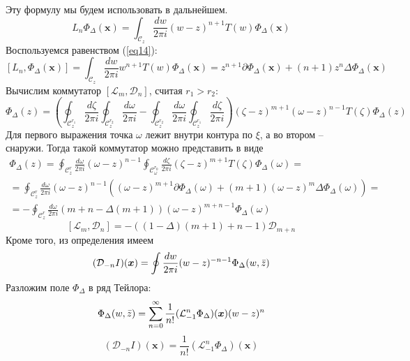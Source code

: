 \documentclass[12pt]{article}
\theoremstyle{definition}
\begin{document}
Эту формулу мы будем использовать в дальнейшем.
\begin{equation}
    L_n\Phi_\Delta(\bm{x})=\int_{\mathcal{C}_z}\frac{dw}{2\pi i}(w-z)^{n+1}T(w)\Phi_\Delta(\bm{x})
\end{equation}
Воспользуемся равенством (\ref{eq14}):
\begin{equation}\label{eq11}
    [L_n,\Phi_\Delta(\bm{x})]=\int_{\mathcal{C}_z}\frac{dw}{2\pi i}w^{n+1}T(w)\Phi_\Delta(\bm{x})=z^{n+1}\partial\Phi_\Delta(\bm{x})+(n+1)z^n\Delta\Phi_\Delta(\bm{x})
\end{equation}
Вычислим коммутатор $[\mathcal{L}_m,\mathcal{D}_n]$, считая $r_1>r_2$:
\begin{equation}
    [\mathcal{L}_m,\mathcal{D}_n]\Phi_\Delta(z)=\left(\oint_{\mathcal{C}^{r_1}_z}\frac{d\zeta}{2\pi i}\oint_{\mathcal{C}^{r_2}_z}\frac{d\omega}{2\pi i}-\oint_{\mathcal{C}^{r_2}_z}\frac{d\omega}{2\pi i}\oint_{\mathcal{C}^{r_1}_z}\frac{d\zeta}{2\pi i}\right)(\zeta-z)^{m+1}(\omega-z)^{n-1}T(\zeta)\Phi_\Delta(z)
\end{equation}
Для первого выражения точка $\omega$ лежит внутри контура по $\xi$, а во втором -- снаружи. Тогда такой коммутатор можно представить в виде
\begin{multline}
    [\mathcal{L}_m,\mathcal{D}_n]\Phi_\Delta(z)=\oint_{\mathcal{C}_z^r}\frac{d\omega}{2\pi i}(\omega-z)^{n-1}\oint_{\mathcal{C}_\omega^{r_0}}\frac{d\zeta}{2\pi i}(\zeta-z)^{m+1}T(\zeta)\Phi_\Delta(\omega)=\\=\oint_{\mathcal{C}_z^r}\frac{d\omega}{2\pi i}(\omega-z)^{n-1}((\omega-z)^{m+1}\partial\Phi_\Delta(\omega)+(m+1)(\omega-z)^m\Delta\Phi_\Delta(\omega))=\\=-\oint_{\mathcal{C}_z^r}\frac{d\omega}{2\pi i}(m+n-\Delta(m+1))(\omega-z)^{m+n-1}\Phi_\Delta(\omega)
\end{multline}
\begin{equation}\label{eq6}
    [\mathcal{L}_m,\mathcal{D}_n]=-((1-\Delta)(m+1)+n-1)\mathcal{D}_{m+n}
\end{equation}
Кроме того, из определения имеем
\begin{equation}
    (\mathcal{D}_{-n}I)(\bm{x})=\oint\frac{dw}{2\pi i}(w-z)^{-n-1}\Phi_\Delta(w,\Bar{z})
\end{equation}
Разложим поле $\Phi_\Delta$ в ряд Тейлора:
\begin{equation}
    \Phi_\Delta(w,\Bar{z})=\sum\limits_{n=0}^\infty\frac{1}{n!}(\mathcal{L}^n_{-1}\Phi_\Delta)(\bm{x})(w-z)^n
\end{equation}
\begin{equation}\label{eq7}
    (\mathcal{D}_{-n}I)(\bm{x})=\frac{1}{n!}(\mathcal{L}^n_{-1}\Phi_\Delta)(\bm{x})
\end{equation}
\end{document}
